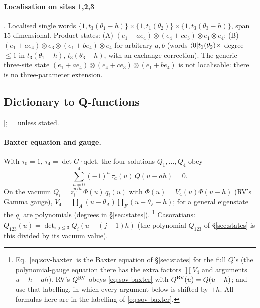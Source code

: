 \paragraph{Localisation on sites 1,2,3} \ex. Localised single words $\{1,t_3(\theta_1-h)\}\times\{1,t_1(\theta_2)\}\times\{1,t_3(\theta_3-h)\}$, span 15-dimensional.
Product states: (A) $(e_1+ae_4)\otimes(e_4+ce_3)\otimes e_1\otimes e_4$; (B) $(e_1+ae_4)\otimes e_3\otimes(e_1+be_4)\otimes e_4$ for arbitrary $a,b$ (words $\langle0|t_1(\theta_2)\times$
degree $\le1$ in $t_3(\theta_1-h)$, $t_3(\theta_3-h)$, with an exchange correction). The generic three-site state $(e_1+ae_4)\otimes(e_4+ce_3)\otimes(e_1+be_4)$ is not
localisable: there is no three-parameter extension.

\subsection{Dictionary to Q-functions}\label{sec:sov-dict}

[; ] \hp\ unless stated.

\paragraph{Baxter equation and gauge.} With $\tau_0=1$, $\tau_4=\det G\cdot\mathrm{qdet}$, the four solutions $Q_1,\dots,Q_4$ obey
\begin{equation}\label{eq:sov-baxter}
 \sum_{a=0}^{4}(-1)^a\,\tau_a(u)\,Q(u-ah)=0 .
\end{equation}
On the vacuum $Q_i=z_i^{u/h}\,\Phi(u)\,q_i(u)$ with $\Phi(u)=V_4(u)\Phi(u-h)$ (RV's Gamma gauge), $V_4=\prod_A(u-\theta_A)\prod_F(u-\theta_F-h)$; for a general
eigenstate the $q_i$ are polynomials (degrees in \S\ref{sec:states}).%
\footnote{Eq.~\eqref{eq:sov-baxter} is the Baxter equation of \S\ref{sec:states} for the full $Q$'s (the polynomial-gauge equation there has the extra factors
$\prod V_4$ and arguments $u+h-ah$). RV's $Q^{\rm RV}$ obeys \eqref{eq:sov-baxter} with $Q^{\rm RV}(u)=Q(u-h)$;  and
 use that labelling, in which every argument below is shifted by $+h$. All formulas here are in the labelling of \eqref{eq:sov-baxter}.}
Casoratians: $Q_{123}(u)=\det_{i,j\le3}Q_i(u-(j-1)h)$ (the polynomial $Q_{123}$ of \S\ref{sec:states} is this divided by its vacuum value).

